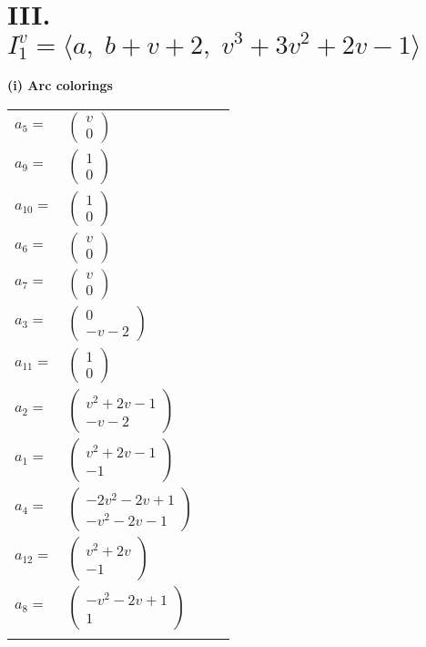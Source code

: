 \documentclass[1p]{elsarticle_modified}
\theoremstyle{definition}
\begin{document}
\centering \section*{III. $I^v_{1}= \langle a,\;b+v+2,\;v^3+3 v^2+2 v-1 \rangle$}
\flushleft \textbf{(i) Arc colorings}\\
\begin{tabular}{m{7pt} m{180pt} m{7pt} m{180pt} }
\flushright $a_{5}=$&$\begin{pmatrix}v\\0\end{pmatrix}$ \\
\flushright $a_{9}=$&$\begin{pmatrix}1\\0\end{pmatrix}$ \\
\flushright $a_{10}=$&$\begin{pmatrix}1\\0\end{pmatrix}$ \\
\flushright $a_{6}=$&$\begin{pmatrix}v\\0\end{pmatrix}$ \\
\flushright $a_{7}=$&$\begin{pmatrix}v\\0\end{pmatrix}$ \\
\flushright $a_{3}=$&$\begin{pmatrix}0\\- v-2\end{pmatrix}$ \\
\flushright $a_{11}=$&$\begin{pmatrix}1\\0\end{pmatrix}$ \\
\flushright $a_{2}=$&$\begin{pmatrix}v^2+2 v-1\\- v-2\end{pmatrix}$ \\
\flushright $a_{1}=$&$\begin{pmatrix}v^2+2 v-1\\-1\end{pmatrix}$ \\
\flushright $a_{4}=$&$\begin{pmatrix}-2 v^2-2 v+1\\- v^2-2 v-1\end{pmatrix}$ \\
\flushright $a_{12}=$&$\begin{pmatrix}v^2+2 v\\-1\end{pmatrix}$ \\
\flushright $a_{8}=$&$\begin{pmatrix}- v^2-2 v+1\\1\end{pmatrix}$\\&\end{tabular}
\end{document}
